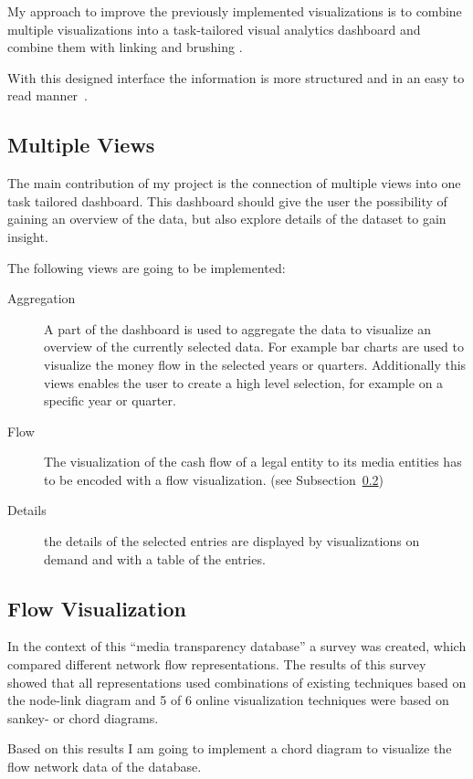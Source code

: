 \documentclass{acmsiggraph}               %
\begin{document}
My approach to improve the previously implemented visualizations is to combine multiple visualizations into a task-tailored visual analytics dashboard \cite{PB-VRVis-2014-028} and combine them with linking and brushing \cite{Ahlberg1994}.
\par
With this designed interface the information is more structured and in an easy to read manner~\cite{Elias2011}.


\subsection{Multiple Views} %
\label{sub:multiple_views}

The main contribution of my project is the connection of multiple views into one task tailored dashboard. This dashboard should give the user the possibility of gaining an overview of the data, but also explore details of the dataset to gain insight.
\par
The following views are going to be implemented:

\begin{description}
  \item[Aggregation] A part of the dashboard is used to aggregate the data to visualize an overview of the currently selected data. For example bar charts are used to visualize the money flow in the selected years or quarters. Additionally this views enables the user to create a high level selection, for example on a specific year or quarter.
  \item[Flow] The visualization of the cash flow of a legal entity to its media entities has to be encoded with a flow visualization. (see Subsection~\ref{sub:flow_visualization})
  \item[Details] the details of the selected entries are displayed by visualizations on demand and with a table of the entries.
\end{description}


\subsection{Flow Visualization} %
\label{sub:flow_visualization}

In the context of this ``media transparency database'' a survey was created, which compared different network flow representations. \cite{survey} The results of this survey showed that all representations used combinations of existing techniques based on the node-link diagram and 5 of 6 online visualization techniques were based on sankey- or chord diagrams. \par
Based on this results I am going to implement a chord diagram to visualize the flow network data of the database.
\end{document}
